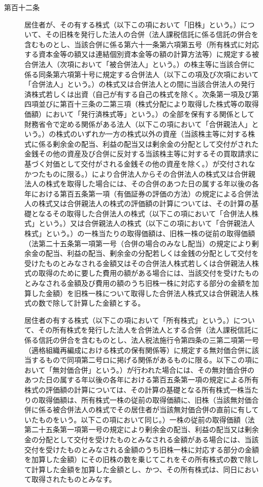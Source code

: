 \documentclass[twocolumn,a4j,10pt]{ltjtarticle}
\begin{document}
\begin{description}
\item[第百十二条]居住者が、その有する株式（以下この項において「旧株」という。）について、その旧株を発行した法人の合併（法人課税信託に係る信託の併合を含むものとし、当該合併に係る第六十一条第六項第五号（所有株式に対応する資本金等の額又は連結個別資本金等の額の計算方法等）に規定する被合併法人（次項において「被合併法人」という。）の株主等に当該合併に係る同条第六項第十号に規定する合併法人（以下この項及び次項において「合併法人」という。）の株式又は合併法人との間に当該合併法人の発行済株式若しくは出資（自己が有する自己の株式を除く。次条第一項及び第四項並びに第百十三条の二第三項（株式分配により取得した株式等の取得価額）において「発行済株式等」という。）の全部を保有する関係として財務省令で定める関係がある法人（以下この項において「合併親法人」という。）の株式のいずれか一方の株式以外の資産（当該株主等に対する株式に係る剰余金の配当、利益の配当又は剰余金の分配として交付がされた金銭その他の資産及び合併に反対する当該株主等に対するその買取請求に基づく対価として交付がされる金銭その他の資産を除く。）が交付されなかつたものに限る。）により合併法人からその合併法人の株式又は合併親法人の株式を取得した場合には、その合併のあつた日の属する年以後の各年における第百五条第一項（有価証券の評価の方法）の規定による合併法人の株式又は合併親法人の株式の評価額の計算については、その計算の基礎となるその取得した合併法人の株式（以下この項において「合併法人株式」という。）又は合併親法人の株式（以下この項において「合併親法人株式」という。）の一株当たりの取得価額は、旧株一株の従前の取得価額（法第二十五条第一項第一号（合併の場合のみなし配当）の規定により剰余金の配当、利益の配当、剰余金の分配若しくは金銭の分配として交付を受けたものとみなされる金額又はその合併法人株式若しくは合併親法人株式の取得のために要した費用の額がある場合には、当該交付を受けたものとみなされる金額及び費用の額のうち旧株一株に対応する部分の金額を加算した金額）を旧株一株について取得した合併法人株式又は合併親法人株式の数で除して計算した金額とする。
\item[]居住者の有する株式（以下この項において「所有株式」という。）について、その所有株式を発行した法人を合併法人とする合併（法人課税信託に係る信託の併合を含むものとし、法人税法施行令第四条の三第二項第一号（適格組織再編成における株式の保有関係等）に規定する無対価合併に該当するもので同項第二号ロに掲げる関係があるものに限る。以下この項において「無対価合併」という。）が行われた場合には、その無対価合併のあつた日の属する年以後の各年における第百五条第一項の規定による所有株式の評価額の計算については、その計算の基礎となる所有株式一株当たりの取得価額は、所有株式一株の従前の取得価額に、旧株（当該無対価合併に係る被合併法人の株式でその居住者が当該無対価合併の直前に有していたものをいう。以下この項において同じ。）一株の従前の取得価額（法第二十五条第一項第一号の規定により剰余金の配当、利益の配当又は剰余金の分配として交付を受けたものとみなされる金額がある場合には、当該交付を受けたものとみなされる金額のうち旧株一株に対応する部分の金額を加算した金額）にその旧株の数を乗じてこれをその所有株式の数で除して計算した金額を加算した金額とし、かつ、その所有株式は、同日において取得されたものとみなす。

\end{description}
\end{document}
